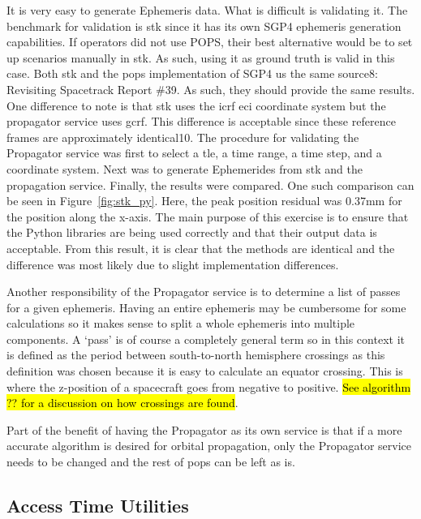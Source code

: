 It is very easy to generate Ephemeris data. What is difficult is validating it.
The benchmark for validation is \gls{stk} since it has its own SGP4 ephemeris
generation capabilities. If operators did not use POPS, their best alternative
would be to set up scenarios manually in \gls{stk}. As such, using it as ground
truth is valid in this case. Both \gls{stk} and the \gls{pops} implementation
of SGP4 us the same source8: Revisiting Spacetrack Report \#39. As such, they
should provide the same results. One difference to note is that \gls{stk} uses
the \gls{icrf} \gls{eci} coordinate system but the propagator service uses
\gls{gcrf}.  This difference is acceptable since these reference frames are
approximately identical10. The procedure for validating the Propagator service
was first to select a \gls{tle}, a time range, a time step, and a coordinate
system.  Next was to generate Ephemerides from \gls{stk} and the propagation
service.  Finally, the results were compared. One such comparison can be seen
in Figure~\ref{fig:stk_py}. Here, the peak position residual was 0.37mm for the position along
the x-axis. The main purpose of this exercise is to ensure that the Python
libraries are being used correctly and that their output data is acceptable.
From this result, it is clear that the methods are identical and the difference
was most likely due to slight implementation differences. 

Another responsibility of the Propagator service is to determine a list of
passes for a given ephemeris. Having an entire ephemeris may be cumbersome for
some calculations so it makes sense to split a whole ephemeris into multiple
components. A `pass' is of course a completely general term so in this context
it is defined as the period between south-to-north hemisphere crossings as this
definition was chosen because it is easy to calculate an equator crossing. This
is where the z-position of a spacecraft goes from negative to positive.
\hl{See algorithm ?? for a discussion on how crossings are found}.

Part of the benefit of having the Propagator as its own service is that if a
more accurate algorithm is desired for orbital propagation, only the Propagator
service needs to be changed and the rest of \gls{pops} can be left as is.


\subsection{Access Time Utilities}


